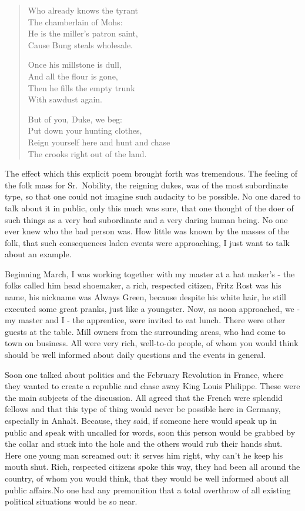 \documentclass{article}
\begin{document}
\begin{quote}
Who already knows the tyrant\\
The chamberlain of Mohs:\\
He is the miller's patron saint,\\
Cause Bung steals wholesale.

Once his millstone is dull,\\
And all the flour is gone,\\
Then he fills the empty trunk\\
With sawdust again.

But of you, Duke, we beg:\\
Put down your hunting clothes,\\
Reign yourself here and hunt and chase\\
The crooks right out of the land.
\end{quote}

The effect which this explicit poem brought forth was tremendous. The feeling of the folk mass for Sr.~Nobility, the reigning dukes, was of the most subordinate type, so that one could not imagine such audacity to be possible. No one dared to talk about it in public, only this much was sure, that one thought of the doer of such things as a very bad subordinate and a very daring human being. No one ever knew who the bad person was. How little was known by the masses of the folk, that such consequences laden events were approaching, I just want to talk about an example.

Beginning March, I was working together with my master at a hat maker's - the folks called him head shoemaker, a rich, respected citizen, Fritz Rost was his name, his nickname was Always Green, because despite his white hair, he still executed some great pranks, just like a youngster. Now, as noon approached, we - my master and I - the apprentice, were invited to eat lunch. There were other guests at the table. Mill owners from the surrounding areas, who had come to town on business. All were very rich, well-to-do people, of whom you would think should be well informed about daily questions and the events in general.

Soon one talked about politics and the February Revolution in France, where they wanted to create a republic and chase away King Louis Philippe. These were the main subjects of the discussion. All agreed that the French were splendid fellows and that this type of thing would never be possible here in Germany, especially in Anhalt. Because, they said, if someone here would speak up in public and speak with uncalled for words, soon this person would be grabbed by the collar and stuck into the hole and the others would rub their hands shut. Here one young man screamed out: it serves him right, why can't he keep his mouth shut. Rich, respected citizens spoke this way, they had been all around the country, of whom you would think, that they would be well informed about all public affairs.No one had any premonition that a total overthrow of all existing political situations would be so near.
\end{document}
